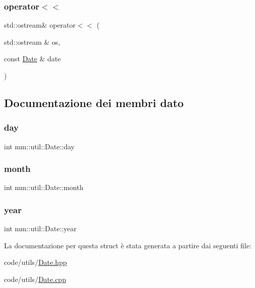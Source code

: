 \subsubsection{\texorpdfstring{operator$<$$<$}{operator<<}}
{\footnotesize\ttfamily std\+::ostream\& operator$<$$<$ (\begin{DoxyParamCaption}\item[{std\+::ostream \&}]{os,  }\item[{const \hyperlink{structmm_1_1util_1_1_date}{Date} \&}]{date }\end{DoxyParamCaption})\hspace{0.3cm}{\ttfamily [friend]}}



\subsection{Documentazione dei membri dato}
\mbox{\label{structmm_1_1util_1_1_date_a6a697c80be4f09cdb4ee400721314d87}} 
\subsubsection{\texorpdfstring{day}{day}}
{\footnotesize\ttfamily int mm\+::util\+::\+Date\+::day}

\mbox{\label{structmm_1_1util_1_1_date_a018f3e7261b88c9a47aae5b08120b331}} 
\subsubsection{\texorpdfstring{month}{month}}
{\footnotesize\ttfamily int mm\+::util\+::\+Date\+::month}

\mbox{\label{structmm_1_1util_1_1_date_a318909ff98468f29c7912fa9cffea079}} 
\subsubsection{\texorpdfstring{year}{year}}
{\footnotesize\ttfamily int mm\+::util\+::\+Date\+::year}



La documentazione per questa struct è stata generata a partire dai seguenti file\+:\begin{DoxyCompactItemize}
\item 
code/utils/\hyperlink{_date_8hpp}{Date.\+hpp}\item 
code/utils/\hyperlink{_date_8cpp}{Date.\+cpp}\end{DoxyCompactItemize}
